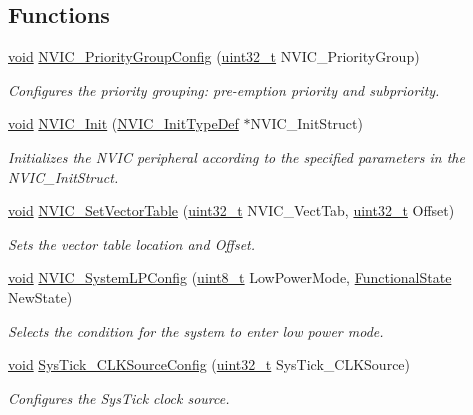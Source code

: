 \subsection*{Functions}
\begin{DoxyCompactItemize}
\item 
\hyperlink{group___n_a_m_e_ga18028b8badbf1ea7e704ccac3c488e82}{void} \hyperlink{group___m_i_s_c_gadfb1f34f803ce54c976643db8c484442}{N\-V\-I\-C\-\_\-\-Priority\-Group\-Config} (\hyperlink{stdint_8h_a435d1572bf3f880d55459d9805097f62}{uint32\-\_\-t} N\-V\-I\-C\-\_\-\-Priority\-Group)
\begin{DoxyCompactList}\small\item\em Configures the priority grouping\-: pre-\/emption priority and subpriority. \end{DoxyCompactList}\item 
\hyperlink{group___n_a_m_e_ga18028b8badbf1ea7e704ccac3c488e82}{void} \hyperlink{group___m_i_s_c_ga4ab373ed0870c06fca5eb51d639adf41}{N\-V\-I\-C\-\_\-\-Init} (\hyperlink{struct_n_v_i_c___init_type_def}{N\-V\-I\-C\-\_\-\-Init\-Type\-Def} $\ast$N\-V\-I\-C\-\_\-\-Init\-Struct)
\begin{DoxyCompactList}\small\item\em Initializes the N\-V\-I\-C peripheral according to the specified parameters in the N\-V\-I\-C\-\_\-\-Init\-Struct. \end{DoxyCompactList}\item 
\hyperlink{group___n_a_m_e_ga18028b8badbf1ea7e704ccac3c488e82}{void} \hyperlink{group___m_i_s_c_ga1145208ad70edfc2fab19b8b8ef1b1a1}{N\-V\-I\-C\-\_\-\-Set\-Vector\-Table} (\hyperlink{stdint_8h_a435d1572bf3f880d55459d9805097f62}{uint32\-\_\-t} N\-V\-I\-C\-\_\-\-Vect\-Tab, \hyperlink{stdint_8h_a435d1572bf3f880d55459d9805097f62}{uint32\-\_\-t} Offset)
\begin{DoxyCompactList}\small\item\em Sets the vector table location and Offset. \end{DoxyCompactList}\item 
\hyperlink{group___n_a_m_e_ga18028b8badbf1ea7e704ccac3c488e82}{void} \hyperlink{group___m_i_s_c_gae21011c5232f5b8f366acbecd12a1d4a}{N\-V\-I\-C\-\_\-\-System\-L\-P\-Config} (\hyperlink{stdint_8h_aba7bc1797add20fe3efdf37ced1182c5}{uint8\-\_\-t} Low\-Power\-Mode, \hyperlink{group___exported__types_gac9a7e9a35d2513ec15c3b537aaa4fba1}{Functional\-State} New\-State)
\begin{DoxyCompactList}\small\item\em Selects the condition for the system to enter low power mode. \end{DoxyCompactList}\item 
\hyperlink{group___n_a_m_e_ga18028b8badbf1ea7e704ccac3c488e82}{void} \hyperlink{group___m_i_s_c_ga2777d255bb06ad62bb6372a9db1ff385}{Sys\-Tick\-\_\-\-C\-L\-K\-Source\-Config} (\hyperlink{stdint_8h_a435d1572bf3f880d55459d9805097f62}{uint32\-\_\-t} Sys\-Tick\-\_\-\-C\-L\-K\-Source)
\begin{DoxyCompactList}\small\item\em Configures the Sys\-Tick clock source. \end{DoxyCompactList}\end{DoxyCompactItemize}


